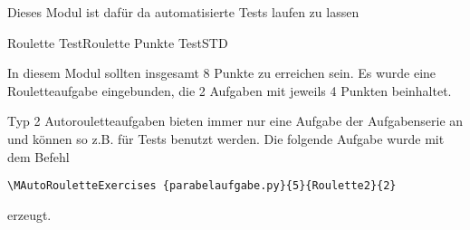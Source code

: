 



\begin{MSectionStart}
Dieses Modul ist dafür da automatisierte Tests laufen zu lassen

\MModstartBox

\end{MSectionStart}



\begin{MXContent}{Roulette Test}{Roulette Punkte Test}{STD}

In diesem Modul sollten insgesamt 8 Punkte zu erreichen sein. Es wurde eine Rouletteaufgabe eingebunden, die 2 Aufgaben mit jeweils 4 Punkten
beinhaltet.

Typ 2 Autorouletteaufgaben bieten immer nur eine Aufgabe der Aufgabenserie an und können so z.B. für Tests benutzt werden.
Die folgende Aufgabe wurde mit dem Befehl
\begin{verbatim}
\MAutoRouletteExercises {parabelaufgabe.py}{5}{Roulette2}{2}
\end{verbatim}
erzeugt.

\end{MXContent}
